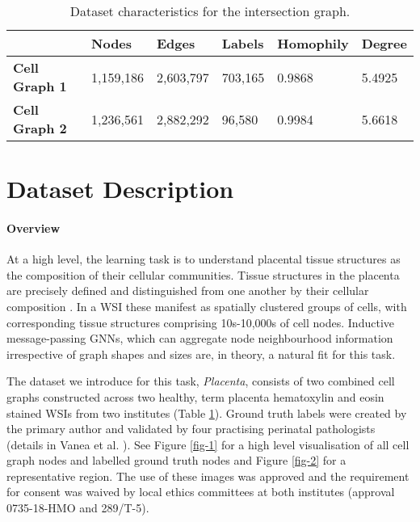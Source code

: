 \documentclass{article}
\begin{document}
\begin{table}
  \caption{Dataset characteristics for the intersection graph.}
  \label{dataset-characteristics}
  \centering
  \begin{tabular}{llllll}
    \toprule
    & \textbf{Nodes} & \textbf{Edges} & \textbf{Labels} & \textbf{Homophily} & \textbf{Degree} \\
    \midrule
    \textbf{Cell Graph 1} & 1,159,186 & 2,603,797 & 703,165 & 0.9868 & 5.4925 \\
    \textbf{Cell Graph 2} & 1,236,561 & 2,882,292 & 96,580  & 0.9984 & 5.6618 \\
    \bottomrule
  \end{tabular}
\end{table}

\section{Dataset Description}
\label{dataset-description}

\paragraph{Overview} At a high level, the learning task is to understand placental tissue structures as the composition of their cellular communities. Tissue structures in the placenta are precisely defined and distinguished from one another by their cellular composition \cite{benirschke_architecture_2012}. In a WSI these manifest as spatially clustered groups of cells, with corresponding tissue structures comprising 10s-10,000s of cell nodes. Inductive message-passing GNNs, which can aggregate node neighbourhood information irrespective of graph shapes and sizes are, in theory, a natural fit for this task.

The dataset we introduce for this task, \emph{Placenta}, consists of two combined cell graphs constructed across two healthy, term placenta hematoxylin and eosin stained WSIs from two institutes (Table \ref{dataset-characteristics}). Ground truth labels were created by the primary author and validated by four practising perinatal pathologists (details in Vanea et al. \cite{vanea_happy_nodate}). See Figure \ref{fig-1} for a high level visualisation of all cell graph nodes and labelled ground truth nodes and Figure \ref{fig-2} for a representative region. The use of these images was approved and the requirement for consent was waived by local ethics committees at both institutes (approval 0735-18-HMO and 289/T-5). 
\end{document}
